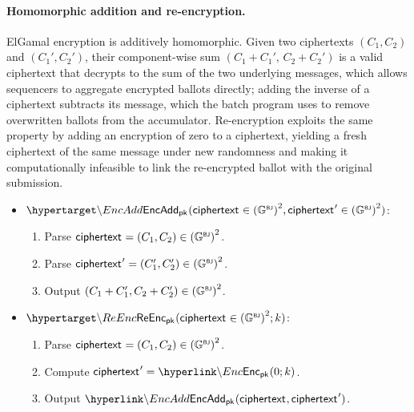 \paragraph{Homomorphic addition and re-encryption.} ElGamal encryption is additively homomorphic. Given two ciphertexts $(C_1, C_2)$ and $(C_1', C_2')$, their component-wise sum $(C_1 + C_1',\, C_2 + C_2')$ is a valid ciphertext that decrypts to the sum of the two underlying messages, which allows sequencers to aggregate encrypted ballots directly; adding the inverse of a ciphertext subtracts its message, which the batch program uses to remove overwritten ballots from the accumulator. Re-encryption exploits the same property by adding an encryption of zero to a ciphertext, yielding a fresh ciphertext of the same message under new randomness and making it computationally infeasible to link the re-encrypted ballot with the original submission.

\begin{mdframed}
	\begin{minipage}[t]{0.50\textwidth}
		\begin{itemize}
			\item[$\bullet$] $\hlset{\EncAdd}_{\pk}(\enc \in {(\BJ{\G})}^2, \enc' \in {(\BJ{\G})}^2)$:
			\begin{enumerate}
				\item Parse ${\sf{ciphertext}^{}} = (C_1, C_2) \in {({\mathbb{G}}^{\text{\tiny \sf BJ}})}^2$.
				\item Parse ${\sf{ciphertext}^{}}' = (C_1', C_2') \in {({\mathbb{G}}^{\text{\tiny \sf BJ}})}^2$.
				\item Output $(C_1 + C_1', C_2 + C_2') \in {({\mathbb{G}}^{\text{\tiny \sf BJ}})}^2$.
			\end{enumerate}
		\end{itemize}
	\end{minipage}
	\begin{minipage}[t]{0.48\textwidth}
		\begin{itemize}
			\item[$\bullet$] $\hlset{\ReEnc}_{\pk}(\enc \in {(\BJ{\G})}^2; k)$: \vspace{0.1cm}
			\begin{enumerate}
				\item Parse ${\sf{ciphertext}^{}} = (C_1, C_2) \in {({\mathbb{G}}^{\text{\tiny \sf BJ}})}^2$.
				\item Compute $\enc' = \hlget{\Enc}_{\pk}(0; k)$.
				\item Output $\hlget{\EncAdd}_{\pk}(\enc, \enc')$.
			\end{enumerate}
		\end{itemize}
	\end{minipage}
\end{mdframed}


